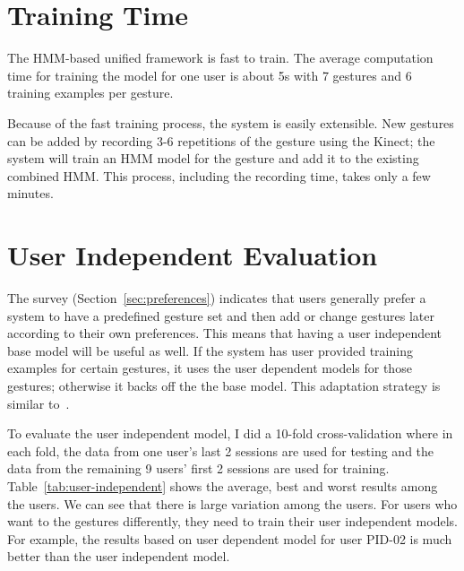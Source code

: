 \section{Training Time}
The HMM-based unified framework is fast to train. The average
computation time for training the model for one user is about 5s with 7 gestures and 6 training examples per
gesture. 

Because of the fast training process, the system is easily extensible. New
gestures can be added by recording 3-6 repetitions of the gesture using the Kinect; the system will train an HMM model for the gesture
and add it to the existing combined HMM. This process, including the recording
time, takes only a few minutes.

\section{User Independent Evaluation}
The survey (Section~\ref{sec:preferences}) indicates that users
generally prefer a system to have a predefined gesture set and then add or
change gestures later according to their own preferences. This means that having
a user independent base model will be useful as well. If the system has user
provided training examples for certain gestures, it uses the
user dependent models for those gestures; otherwise it backs off the the base
model. This adaptation strategy is similar to~\cite{yin13-making}.

To evaluate the user independent model, I did a 10-fold cross-validation where
in each fold, the data from one user's last 2 sessions are used for testing and
the data from the remaining 9 users' first 2 sessions are used for training.
Table~\ref{tab:user-independent} shows the average, best and worst results among
the users. We can see that there is large variation among the users. For users
who want to the gestures differently, they need to train their user independent
models. For example, the results based on user dependent model for user PID-02
is much better than the user independent model.


